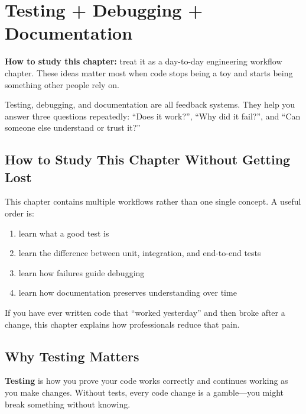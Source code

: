 \documentclass[12pt, a4paper, oneside]{book}
\begin{document}
\chapter{Testing + Debugging + Documentation}

\begin{studybox}
\textbf{How to study this chapter:} treat it as a day-to-day engineering workflow chapter. These ideas matter most when code stops being a toy and starts being something other people rely on.
\end{studybox}

\begin{intuitionbox}
Testing, debugging, and documentation are all feedback systems. They help you answer three questions repeatedly: ``Does it work?'', ``Why did it fail?'', and ``Can someone else understand or trust it?''
\end{intuitionbox}

\section{How to Study This Chapter Without Getting Lost}

This chapter contains multiple workflows rather than one single concept. A useful order is:
\begin{enumerate}[leftmargin=2em]
    \item learn what a good test is
    \item learn the difference between unit, integration, and end-to-end tests
    \item learn how failures guide debugging
    \item learn how documentation preserves understanding over time
\end{enumerate}

\begin{notebox}
If you have ever written code that ``worked yesterday'' and then broke after a change, this chapter explains how professionals reduce that pain.
\end{notebox}

\section{Why Testing Matters}

\textbf{Testing} is how you prove your code works correctly and continues working as you make changes. Without tests, every code change is a gamble---you might break something without knowing.
\end{document}
